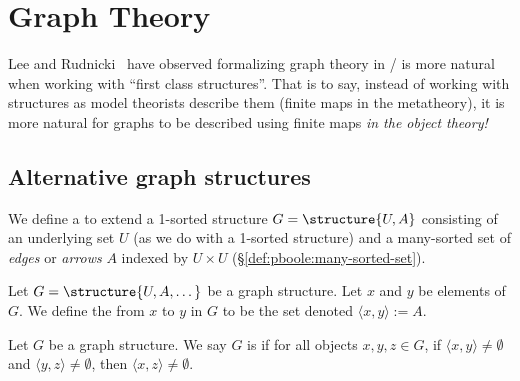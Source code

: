 
\chapter{Graph Theory}

\begin{remark}
Lee and Rudnicki~\cite{lee2007alternative} have observed formalizing
graph theory in \Mizar/ is more natural when working with ``first
class structures''. That is to say, instead of working with structures
as model theorists describe them (finite maps in the metatheory), it
is more natural for graphs to be described using finite maps
\emph{in the object theory!}
\end{remark}

\section{Alternative graph structures}

\begin{definition}\label{def:graphs:graph-structure}
We define a  to extend a 1-sorted structure
$G=\structure{U,A}$ consisting of an underlying set $U$ (as we do with
a 1-sorted structure) and a many-sorted set of \emph{edges} or
\emph{arrows} $A$ indexed by $U\times U$
(\S\ref{def:pboole:many-sorted-set}).
\end{definition}

\begin{definition}
Let $G=\structure{U,A,\dots}$ be a graph structure. Let $x$ and $y$ be elements of $G$.
We define the  from $x$ to $y$ in $G$ to be the
set denoted $\langle x,y\rangle:=A$.
\end{definition}

\begin{definition}
Let $G$ be a graph structure. We say $G$ is  if for
all objects $x,y,z\in G$, if $\langle x,y\rangle\neq\emptyset$ and
$\langle y,z\rangle\neq\emptyset$, then $\langle x,z\rangle\neq\emptyset$.
\end{definition}

